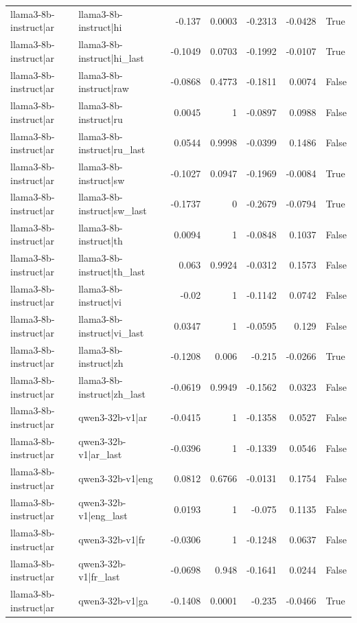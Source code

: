 \begin{table}
\begin{tabular}{l l r r r r l}
llama3-8b-instruct|ar & llama3-8b-instruct|hi & -0.137 & 0.0003 & -0.2313 & -0.0428 & True \\
llama3-8b-instruct|ar & llama3-8b-instruct|hi_last & -0.1049 & 0.0703 & -0.1992 & -0.0107 & True \\
llama3-8b-instruct|ar & llama3-8b-instruct|raw & -0.0868 & 0.4773 & -0.1811 & 0.0074 & False \\
llama3-8b-instruct|ar & llama3-8b-instruct|ru & 0.0045 & 1 & -0.0897 & 0.0988 & False \\
llama3-8b-instruct|ar & llama3-8b-instruct|ru_last & 0.0544 & 0.9998 & -0.0399 & 0.1486 & False \\
llama3-8b-instruct|ar & llama3-8b-instruct|sw & -0.1027 & 0.0947 & -0.1969 & -0.0084 & True \\
llama3-8b-instruct|ar & llama3-8b-instruct|sw_last & -0.1737 & 0 & -0.2679 & -0.0794 & True \\
llama3-8b-instruct|ar & llama3-8b-instruct|th & 0.0094 & 1 & -0.0848 & 0.1037 & False \\
llama3-8b-instruct|ar & llama3-8b-instruct|th_last & 0.063 & 0.9924 & -0.0312 & 0.1573 & False \\
llama3-8b-instruct|ar & llama3-8b-instruct|vi & -0.02 & 1 & -0.1142 & 0.0742 & False \\
llama3-8b-instruct|ar & llama3-8b-instruct|vi_last & 0.0347 & 1 & -0.0595 & 0.129 & False \\
llama3-8b-instruct|ar & llama3-8b-instruct|zh & -0.1208 & 0.006 & -0.215 & -0.0266 & True \\
llama3-8b-instruct|ar & llama3-8b-instruct|zh_last & -0.0619 & 0.9949 & -0.1562 & 0.0323 & False \\
llama3-8b-instruct|ar & qwen3-32b-v1|ar & -0.0415 & 1 & -0.1358 & 0.0527 & False \\
llama3-8b-instruct|ar & qwen3-32b-v1|ar_last & -0.0396 & 1 & -0.1339 & 0.0546 & False \\
llama3-8b-instruct|ar & qwen3-32b-v1|eng & 0.0812 & 0.6766 & -0.0131 & 0.1754 & False \\
llama3-8b-instruct|ar & qwen3-32b-v1|eng_last & 0.0193 & 1 & -0.075 & 0.1135 & False \\
llama3-8b-instruct|ar & qwen3-32b-v1|fr & -0.0306 & 1 & -0.1248 & 0.0637 & False \\
llama3-8b-instruct|ar & qwen3-32b-v1|fr_last & -0.0698 & 0.948 & -0.1641 & 0.0244 & False \\
llama3-8b-instruct|ar & qwen3-32b-v1|ga & -0.1408 & 0.0001 & -0.235 & -0.0466 & True \\

\end{tabular}
\end{table}

